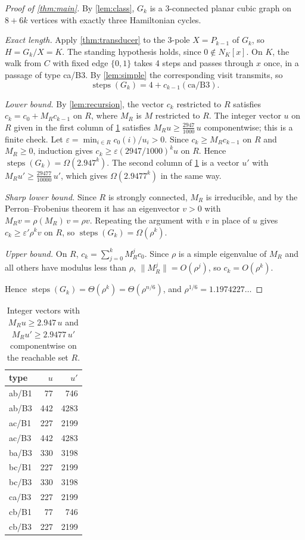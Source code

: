 \documentclass[11pt]{article}
\theoremstyle{definition}
\newcommand{\steps}{\operatorname{steps}}
\begin{document}
\begin{proof}[Proof of \cref{thm:main}]
By \cref{lem:class}, $G_k$ is a 3-connected planar cubic graph on $8+6k$ vertices with exactly three
Hamiltonian cycles.

\emph{Exact length.} Apply \cref{thm:transducer} to the 3-pole $X = P_{k-1}$ of $G_k$, so
$H = G_k/X = K$. The standing hypothesis holds, since $0 \notin N_K[x]$. On $K$, the walk from $C$
with fixed edge $\{0,1\}$ takes 4 steps and passes through $x$ once, in a passage of type ca/B3. By
\cref{lem:simple} the corresponding visit transmits, so
\[
\steps(G_k) = 4 + c_{k-1}(\mathrm{ca/B3}).
\]

\emph{Lower bound.} By \cref{lem:recursion}, the vector $c_k$ restricted to $R$ satisfies
$c_k = c_0 + M_R c_{k-1}$ on $R$, where $M_R$ is $M$ restricted to $R$. The integer vector $u$ on
$R$ given in the first column of \cref{tab:cert} satisfies $M_R u \ge \frac{2947}{1000}\,u$
componentwise; this is a finite check. Let $\varepsilon = \min_{i \in R} c_0(i)/u_i > 0$. Since
$c_k \ge M_R c_{k-1}$ on $R$ and $M_R \ge 0$, induction gives
$c_k \ge \varepsilon (2947/1000)^k u$ on $R$. Hence $\steps(G_k) = \Omega(2.947^k)$. The second
column of \cref{tab:cert} is a vector $u'$ with $M_R u' \ge \frac{29477}{10000}\,u'$, which gives
$\Omega(2.9477^k)$ in the same way.

\emph{Sharp lower bound.} Since $R$ is strongly connected, $M_R$ is irreducible, and by the
Perron--Frobenius theorem it has an eigenvector $v > 0$ with $M_R v = \rho(M_R)\, v = \rho v$.
Repeating the argument with $v$ in place of $u$ gives $c_k \ge \varepsilon' \rho^k v$ on $R$, so
$\steps(G_k) = \Omega(\rho^k)$.

\emph{Upper bound.} On $R$, $c_k = \sum_{j=0}^{k} M_R^j c_0$. Since $\rho$ is a simple eigenvalue of
$M_R$ and all others have modulus less than $\rho$, $\|M_R^j\| = O(\rho^j)$, so $c_k = O(\rho^k)$.

Hence $\steps(G_k) = \Theta(\rho^k) = \Theta(\rho^{n/6})$, and $\rho^{1/6} = 1.1974227\ldots$
\end{proof}

\begin{table}[t]
\centering\small
\begin{tabular}{lrr}
\toprule
type & $u$ & $u'$ \\
\midrule
ab/B1 & 77 & 746 \\
ab/B3 & 442 & 4283 \\
ac/B1 & 227 & 2199 \\
ac/B3 & 442 & 4283 \\
ba/B3 & 330 & 3198 \\
bc/B1 & 227 & 2199 \\
bc/B3 & 330 & 3198 \\
ca/B3 & 227 & 2199 \\
cb/B1 & 77 & 746 \\
cb/B3 & 227 & 2199 \\
\bottomrule
\end{tabular}
\caption{Integer vectors with $M_R u \ge 2.947\,u$ and $M_R u' \ge 2.9477\,u'$ componentwise on the
reachable set $R$.}
\label{tab:cert}
\end{table}
\end{document}
